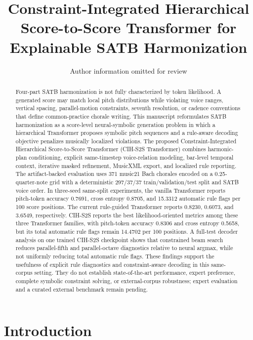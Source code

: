 \documentclass[11pt]{article}
\title{Constraint-Integrated Hierarchical Score-to-Score Transformer for Explainable SATB Harmonization}
\author{Author information omitted for review}
\date{}
\begin{document}
\maketitle

\begin{abstract}
Four-part SATB harmonization is not fully characterized by token likelihood. A generated score may match local pitch distributions while violating voice ranges, vertical spacing, parallel-motion constraints, seventh resolution, or cadence conventions that define common-practice chorale writing. This manuscript reformulates SATB harmonization as a score-level neural-symbolic generation problem in which a hierarchical Transformer proposes symbolic pitch sequences and a rule-aware decoding objective penalizes musically localized violations. The proposed Constraint-Integrated Hierarchical Score-to-Score Transformer (CIH-S2S Transformer) combines harmonic-plan conditioning, explicit same-timestep voice-relation modeling, bar-level temporal context, iterative masked refinement, MusicXML export, and localized rule reporting. The artifact-backed evaluation uses 371 music21 Bach chorales encoded on a 0.25-quarter-note grid with a deterministic 297/37/37 train/validation/test split and SATB voice order. In three-seed same-split experiments, the vanilla Transformer reports pitch-token accuracy 0.7691, cross entropy 0.8705, and 15.3312 automatic rule flags per 100 score positions. The current rule-guided Transformer reports 0.8230, 0.6073, and 3.6549, respectively. CIH-S2S reports the best likelihood-oriented metrics among these three Transformer families, with pitch-token accuracy 0.8306 and cross entropy 0.5658, but its total automatic rule flags remain 14.4702 per 100 positions. A full-test decoder analysis on one trained CIH-S2S checkpoint shows that constrained beam search reduces parallel-fifth and parallel-octave diagnostics relative to neural argmax, while not uniformly reducing total automatic rule flags. These findings support the usefulness of explicit rule diagnostics and constraint-aware decoding in this same-corpus setting. They do not establish state-of-the-art performance, expert preference, complete symbolic constraint solving, or external-corpus robustness; expert evaluation and a curated external benchmark remain pending.
\end{abstract}

\section{Introduction}
\end{document}

